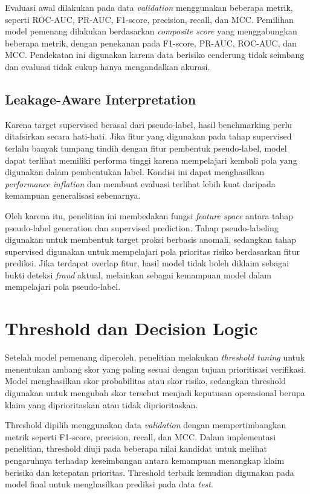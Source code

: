 Evaluasi awal dilakukan pada data \emph{validation} menggunakan beberapa metrik, seperti ROC-AUC, PR-AUC, F1-score, precision, recall, dan MCC. Pemilihan model pemenang dilakukan berdasarkan \emph{composite score} yang menggabungkan beberapa metrik, dengan penekanan pada F1-score, PR-AUC, ROC-AUC, dan MCC. Pendekatan ini digunakan karena data berisiko cenderung tidak seimbang dan evaluasi tidak cukup hanya mengandalkan akurasi.

\subsection{Leakage-Aware Interpretation}\label{leakage-aware-interpretation}

Karena target supervised berasal dari pseudo-label, hasil benchmarking perlu ditafsirkan secara hati-hati. Jika fitur yang digunakan pada tahap supervised terlalu banyak tumpang tindih dengan fitur pembentuk pseudo-label, model dapat terlihat memiliki performa tinggi karena mempelajari kembali pola yang digunakan dalam pembentukan label. Kondisi ini dapat menghasilkan \emph{performance inflation} dan membuat evaluasi terlihat lebih kuat daripada kemampuan generalisasi sebenarnya.

Oleh karena itu, penelitian ini membedakan fungsi \emph{feature space} antara tahap pseudo-label generation dan supervised prediction. Tahap pseudo-labeling digunakan untuk membentuk target proksi berbasis anomali, sedangkan tahap supervised digunakan untuk mempelajari pola prioritas risiko berdasarkan fitur prediksi. Jika terdapat overlap fitur, hasil model tidak boleh diklaim sebagai bukti deteksi \emph{fraud} aktual, melainkan sebagai kemampuan model dalam mempelajari pola pseudo-label.

\section{Threshold dan Decision Logic}\label{threshold-dan-decision-logic}

Setelah model pemenang diperoleh, penelitian melakukan \emph{threshold tuning} untuk menentukan ambang skor yang paling sesuai dengan tujuan prioritisasi verifikasi. Model menghasilkan skor probabilitas atau skor risiko, sedangkan threshold digunakan untuk mengubah skor tersebut menjadi keputusan operasional berupa klaim yang diprioritaskan atau tidak diprioritaskan.

Threshold dipilih menggunakan data \emph{validation} dengan mempertimbangkan metrik seperti F1-score, precision, recall, dan MCC. Dalam implementasi penelitian, threshold diuji pada beberapa nilai kandidat untuk melihat pengaruhnya terhadap keseimbangan antara kemampuan menangkap klaim berisiko dan ketepatan prioritas. Threshold terbaik kemudian digunakan pada model final untuk menghasilkan prediksi pada data \emph{test}.

